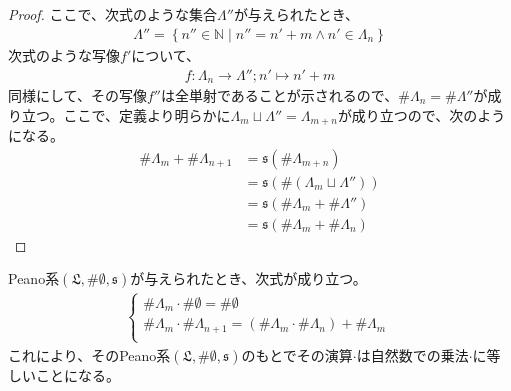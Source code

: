\documentclass[dvipdfmx]{jsarticle}
\begin{document}
\begin{proof}
ここで、次式のような集合$\varLambda''$が与えられたとき、
\begin{align*}
\varLambda'' = \left\{ n'' \in \mathbb{N} \middle| n'' = n' + m \land n' \in \varLambda_{n} \right\}
\end{align*}
次式のような写像$f'$について、
\begin{align*}
f:\varLambda_{n} \rightarrow \varLambda'';n' \mapsto n' + m
\end{align*}
同様にして、その写像$f''$は全単射であることが示されるので、$\# \varLambda_{n} = \# \varLambda''$が成り立つ。ここで、定義より明らかに$\varLambda_{m} \sqcup \varLambda'' = \varLambda_{m + n}$が成り立つので、次のようになる。
\begin{align*}
\# \varLambda_{m} + \# \varLambda_{n + 1}&=\mathfrak{s}\left( \# \varLambda_{m + n} \right)\\
&=\mathfrak{s}\left( \# \left( \varLambda_{m} \sqcup \varLambda'' \right) \right)\\
&=\mathfrak{s}\left( \# \varLambda_{m} + \# \varLambda'' \right)\\
&=\mathfrak{s}\left( \# \varLambda_{m} + \# \varLambda_{n} \right)
\end{align*}
\end{proof}
\begin{thm}\label{1.2.8.13}
Peano系$\left( \mathfrak{L,}\# \emptyset ,\mathfrak{s} \right)$が与えられたとき、次式が成り立つ。
\begin{align*}
\left\{ \begin{matrix}
\# \varLambda_{m} \cdot \# \emptyset  = \# \emptyset  \\
\# \varLambda_{m} \cdot \# \varLambda_{n + 1} = \left( \# \varLambda_{m} \cdot \# \varLambda_{n} \right) + \# \varLambda_{m} \\
\end{matrix} \right.\ 
\end{align*}
これにより、そのPeano系$\left( \mathfrak{L,}\# \emptyset ,\mathfrak{s} \right)$のもとでその演算$\cdot$は自然数での乗法$\cdot$に等しいことになる。
\end{thm}
\end{document}
